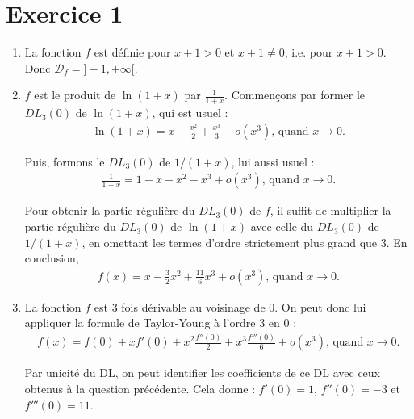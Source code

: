 \documentclass[12pt,a4paper]{article}
\begin{document}
\section*{Exercice 1}

\begin{enumerate}
	\item La fonction $f$ est définie pour $x+1 > 0$ et $x+1 \neq 0$, i.e. pour $x+1 > 0$. Donc $\mathcal{D}_f = ]-1,+\infty [$.
	
	\vspace{0.5\baselineskip}
	
	\item $f$ est le produit de $\ln(1+x)$ par $\frac{1}{1+x}$. Commençons par former le $DL_3(0)$ de $\ln(1+x)$, qui est usuel :
	\begin{align*}
			\ln(1+x) = x - \frac{x^2}{2} + \frac{x^3}{3} + o(x^3) \text{, quand } x \to 0.
	\end{align*}
	
	Puis, formons le $DL_3(0)$ de $1/(1+x)$, lui aussi usuel :
	\begin{align*}
		\frac{1}{1+x} = 1 - x + x^2 - x^3 + o(x^3) \text{, quand } x \to 0.
	\end{align*}
	
	Pour obtenir la partie régulière du $DL_3(0)$ de $f$, il suffit de multiplier la partie régulière du $DL_3(0)$ de $\ln(1+x)$ avec celle du $DL_3(0)$ de $1/(1+x)$, en omettant les termes d'ordre strictement plus grand que $3$. En conclusion,
	\begin{align*}
	f(x) = x - \frac{3}{2}x^2 +\frac{11}{6}x^3 + o(x^3) \text{, quand } x \to 0.
	\end{align*}
	
	\vspace{0.5\baselineskip}
	
	\item La fonction $f$ est 3 fois dérivable au voisinage de $0$. On peut donc lui appliquer la formule de Taylor-Young à l'ordre 3 en $0$ :
	\begin{align*}
		f(x) = f(0) + xf'(0) + x^2 \frac{f''(0)}{2} + x^3 \frac{f'''(0)}{6} + o(x^3) \text{, quand } x \to 0.
	\end{align*}
	
	Par unicité du DL, on peut identifier les coefficients de ce DL avec ceux obtenus à la question précédente. Cela donne : $f'(0) = 1$, $f''(0) = -3$ et $f'''(0) = 11$.
	
	\vspace{0.5\baselineskip}
	

\end{enumerate}
\end{document}
